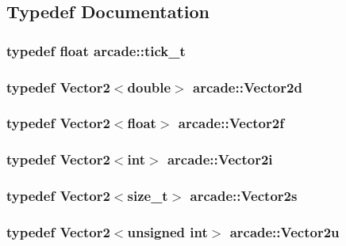 \subsection{Typedef Documentation}
\hypertarget{namespacearcade_a0310f1a25932c12488a64333351f88f6}{
\subsubsection[{tick\-\_\-t}]{\setlength{\rightskip}{0pt plus 5cm}typedef float {\bf arcade\-::tick\-\_\-t}}}\label{namespacearcade_a0310f1a25932c12488a64333351f88f6}
\hypertarget{namespacearcade_ad7fa150bb74a2e66cb4fa04d6fb79e97}{
\subsubsection[{Vector2d}]{\setlength{\rightskip}{0pt plus 5cm}typedef {\bf Vector2}$<$double$>$ {\bf arcade\-::\-Vector2d}}}\label{namespacearcade_ad7fa150bb74a2e66cb4fa04d6fb79e97}
\hypertarget{namespacearcade_a669065a59d7a67f9f522994ba1330c9d}{
\subsubsection[{Vector2f}]{\setlength{\rightskip}{0pt plus 5cm}typedef {\bf Vector2}$<$float$>$ {\bf arcade\-::\-Vector2f}}}\label{namespacearcade_a669065a59d7a67f9f522994ba1330c9d}
\hypertarget{namespacearcade_aaa528de7dfbe798ae3ad369c9c464f51}{
\subsubsection[{Vector2i}]{\setlength{\rightskip}{0pt plus 5cm}typedef {\bf Vector2}$<${\bf int}$>$ {\bf arcade\-::\-Vector2i}}}\label{namespacearcade_aaa528de7dfbe798ae3ad369c9c464f51}
\hypertarget{namespacearcade_a8e527f7400fbff9c38dc31e0a3dd06a1}{
\subsubsection[{Vector2s}]{\setlength{\rightskip}{0pt plus 5cm}typedef {\bf Vector2}$<${\bf size\-\_\-t}$>$ {\bf arcade\-::\-Vector2s}}}\label{namespacearcade_a8e527f7400fbff9c38dc31e0a3dd06a1}
\hypertarget{namespacearcade_a653661492cf890c245ae977241177880}{
\subsubsection[{Vector2u}]{\setlength{\rightskip}{0pt plus 5cm}typedef {\bf Vector2}$<${\bf unsigned} {\bf int}$>$ {\bf arcade\-::\-Vector2u}}}\label{namespacearcade_a653661492cf890c245ae977241177880}


